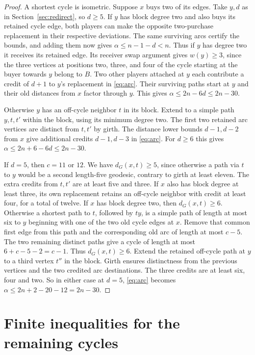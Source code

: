 \documentclass[11pt]{article}
\newcommand{\dG}{d_G}
\begin{document}
\begin{proof}
A shortest cycle is isometric. Suppose \(x\) buys two of its edges.
Take \(y,d\) as in Section~\ref{sec:redirect}, so \(d\ge5\).
If \(y\) has block degree two and also buys its retained cycle
edge, both players can make the opposite two-purchase replacement
in their respective deviations. The same surviving arcs certify
the bounds, and adding them now gives
\(\alpha\le n-1-d<n\). Thus if \(y\) has degree two it receives
its retained edge. Its receiver swap argument gives \(w(y)\ge3\),
since the three vertices at positions two, three, and four of
the cycle starting at the buyer towards \(y\) belong to \(B\).
Two other players attached at \(y\) each contribute a credit
of \(d+1\) to \(y\)'s replacement in \eqref{eq:arc}. Their surviving
paths start at \(y\) and their old distances from \(x\) factor through
\(y\). This gives \(\alpha\le 2n-6d\le2n-30\).

Otherwise \(y\) has an off-cycle neighbor \(t\) in its block.
Extend to a simple path \(y,t,t'\) within the block, using its
minimum degree two. The first two retained arc vertices are distinct
from \(t,t'\) by girth. The distance lower bounds \(d-1,d-2\)
from \(x\) give additional credits \(d-1,d-3\) in
\eqref{eq:arc}. For \(d\ge6\) this gives
\(\alpha\le2n+6-6d\le2n-30\).

If \(d=5\), then \(c=11\) or \(12\).
We have \(\dG(x,t)\ge5\), since otherwise a path via \(t\)
to \(y\) would be a second length-five geodesic, contrary
to girth at least eleven. The extra credits from \(t,t'\)
are at least five and three. If \(x\) also has block degree
at least three, its own replacement retains an off-cycle
neighbor with credit at least four, for a total of twelve.
If \(x\) has block degree two, then \(\dG(x,t)\ge6\).
Otherwise a shortest path to \(t\), followed by \(ty\),
is a simple path of length at most six to \(y\) beginning
with one of the two old cycle edges at \(x\). Remove that
common first edge from this path and the corresponding old
arc of length at most \(c-5\). The two remaining distinct paths
give a cycle of length at most \(6+c-5-2=c-1\).
Thus \(\dG(x,t)\ge6\). Extend the retained off-cycle path
at \(y\) to a third vertex \(t''\) in the block. Girth ensures
distinctness from the previous vertices and the two credited
arc destinations. The three credits are at least six, four
and two. So in either case at \(d=5\), \eqref{eq:arc} becomes
\(\alpha\le2n+2-20-12=2n-30\).
\end{proof}

\section{Finite inequalities for the remaining cycles}\label{sec:cert}
\end{document}
